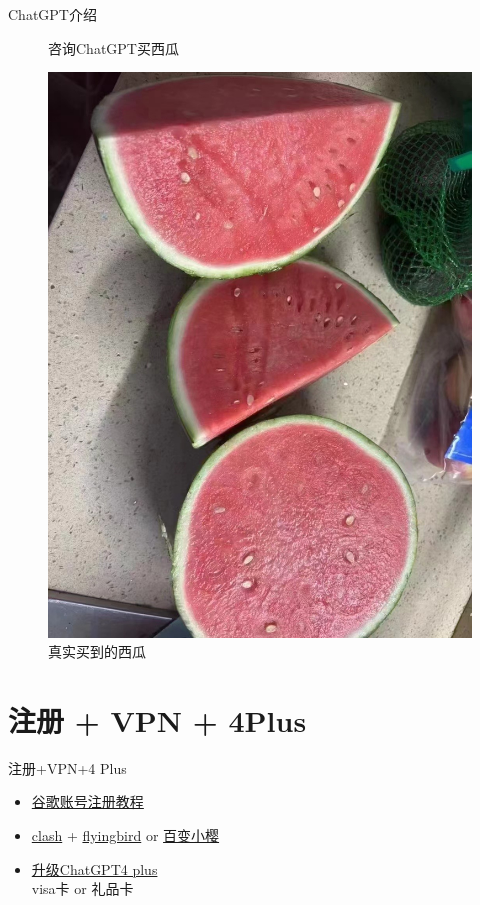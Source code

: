 \documentclass[12pt, aspectration=54, UTF8]{beamer}
\begin{document}
\begin{frame}{ChatGPT介绍}
\begin{figure}[htbp]
\begin{minipage}[b]{0.49\linewidth}
            \caption{咨询ChatGPT买西瓜}
            \label{fig:enter-label1}
        \end{minipage}
        \hfill
        \begin{minipage}[b]{0.49\linewidth}
            \centering
            \includegraphics[height=0.6\textheight]{Images/2.jpg}
            \caption{真实买到的西瓜}
            \label{fig:enter-label2}
        \end{minipage}
    \end{figure}
\end{frame}

\section{注册 + VPN + 4Plus}
\begin{frame}{注册+VPN+4 Plus}
\justifying
    \begin{itemize}
        \item \href{https://www.youtube.com/watch?v=KzvBFQOXUaw&t=106s}{谷歌账号注册教程}
        \item \href{https://github.com/Z-Siqi/Clash-for-Windows_Chinese}{clash} + \href{https://fbweb02.flyingbird.la}{flyingbird} or \href{https://bbxy.info/user}{百变小樱}
        \item \hyperlink{item3}{升级ChatGPT4 plus}
            \\visa卡 or 礼品卡
    \end{itemize}
\end{frame}
\end{document}
